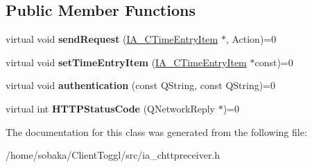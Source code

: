\subsection*{Public Member Functions}
\begin{DoxyCompactItemize}
\item 
\mbox{\label{classIA__CHTTPReceiver_ac639247e6c5b777f41ecd10015687762}} 
virtual void {\bfseries send\+Request} (\hyperlink{classIA__CTimeEntryItem}{I\+A\+\_\+\+C\+Time\+Entry\+Item} $\ast$, Action)=0
\item 
\mbox{\label{classIA__CHTTPReceiver_ae2ee40e7bdfae041850baca0c8e75a3e}} 
virtual void {\bfseries set\+Time\+Entry\+Item} (\hyperlink{classIA__CTimeEntryItem}{I\+A\+\_\+\+C\+Time\+Entry\+Item} $\ast$const)=0
\item 
\mbox{\label{classIA__CHTTPReceiver_a419e405269891eaeec3d69b45c00f46c}} 
virtual void {\bfseries authentication} (const Q\+String, const Q\+String)=0
\item 
\mbox{\label{classIA__CHTTPReceiver_ac945861031d6dd5b27abf34076ddc3a2}} 
virtual int {\bfseries H\+T\+T\+P\+Status\+Code} (Q\+Network\+Reply $\ast$)=0
\end{DoxyCompactItemize}


The documentation for this class was generated from the following file\+:\begin{DoxyCompactItemize}
\item 
/home/sobaka/\+Client\+Toggl/src/ia\+\_\+chttpreceiver.\+h\end{DoxyCompactItemize}
